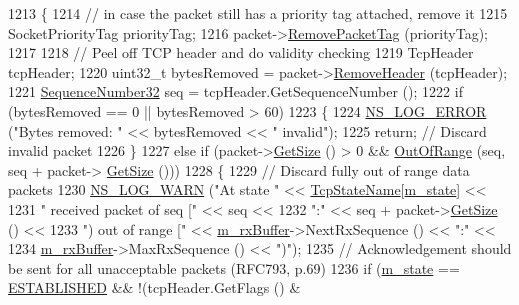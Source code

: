 \begin{DoxyCode}
1213 \{
1214   \textcolor{comment}{// in case the packet still has a priority tag attached, remove it}
1215   SocketPriorityTag priorityTag;
1216   packet->\hyperlink{classns3_1_1Packet_a078fe922d976a417ab25ba2f3c2fd667}{RemovePacketTag} (priorityTag);
1217 
1218   \textcolor{comment}{// Peel off TCP header and do validity checking}
1219   TcpHeader tcpHeader;
1220   uint32\_t bytesRemoved = packet->\hyperlink{classns3_1_1Packet_a0961eccf975d75f902d40956c93ba63e}{RemoveHeader} (tcpHeader);
1221   \hyperlink{group__network_gacb2070e4e98d2d5135c9bede58f07a03}{SequenceNumber32} seq = tcpHeader.GetSequenceNumber ();
1222   \textcolor{keywordflow}{if} (bytesRemoved == 0 || bytesRemoved > 60)
1223     \{
1224       \hyperlink{group__logging_ga0261a8db1d4ac5f79417d117634fd455}{NS\_LOG\_ERROR} (\textcolor{stringliteral}{"Bytes removed: "} << bytesRemoved << \textcolor{stringliteral}{" invalid"});
1225       \textcolor{keywordflow}{return}; \textcolor{comment}{// Discard invalid packet}
1226     \}
1227   \textcolor{keywordflow}{else} \textcolor{keywordflow}{if} (packet->\hyperlink{classns3_1_1Packet_a462855c9929954d4301a4edfe55f4f1c}{GetSize} () > 0 && \hyperlink{classns3_1_1TcpSocketBase_a99af6d09e114652b31187db88da577b6}{OutOfRange} (seq, seq + packet->
      \hyperlink{classns3_1_1Packet_a462855c9929954d4301a4edfe55f4f1c}{GetSize} ()))
1228     \{
1229       \textcolor{comment}{// Discard fully out of range data packets}
1230       \hyperlink{group__logging_gade7208b4009cdf0e25783cd26766f559}{NS\_LOG\_WARN} (\textcolor{stringliteral}{"At state "} << \hyperlink{classns3_1_1TcpSocket_a1706f3309652d17f052b7d05816dd5ba}{TcpStateName}[\hyperlink{classns3_1_1TcpSocketBase_a5db6f29272f23546e23320c06a681f3e}{m\_state}] <<
1231                    \textcolor{stringliteral}{" received packet of seq ["} << seq <<
1232                    \textcolor{stringliteral}{":"} << seq + packet->\hyperlink{classns3_1_1Packet_a462855c9929954d4301a4edfe55f4f1c}{GetSize} () <<
1233                    \textcolor{stringliteral}{") out of range ["} << \hyperlink{classns3_1_1TcpSocketBase_a0163894148e5a70e6bd89970a1483fae}{m\_rxBuffer}->NextRxSequence () << \textcolor{stringliteral}{":"} <<
1234                    \hyperlink{classns3_1_1TcpSocketBase_a0163894148e5a70e6bd89970a1483fae}{m\_rxBuffer}->MaxRxSequence () << \textcolor{stringliteral}{")"});
1235       \textcolor{comment}{// Acknowledgement should be sent for all unacceptable packets (RFC793, p.69)}
1236       \textcolor{keywordflow}{if} (\hyperlink{classns3_1_1TcpSocketBase_a5db6f29272f23546e23320c06a681f3e}{m\_state} == \hyperlink{group__tcp_gga3929cdb47bdf159657fa24054aa5ca03a1826ad465d372319d1db905886de3743}{ESTABLISHED} && !(tcpHeader.GetFlags () & 

\end{DoxyCode}
